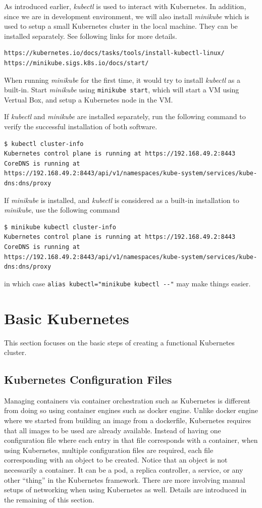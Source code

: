 As introduced earlier, \textit{kubectl} is used to interact with Kubernetes. In addition, since we are in development environment, we will also install \textit{minikube} which is used to setup a small Kubernetes cluster in the local machine. They can be installed separately. See following links for more details.
\begin{lstlisting}
https://kubernetes.io/docs/tasks/tools/install-kubectl-linux/
https://minikube.sigs.k8s.io/docs/start/
\end{lstlisting}
When running \textit{minikube} for the first time, it would try to install \textit{kubectl} as a built-in. Start \textit{minikube} using \verb|minikube start|, which will start a VM using Vertual Box, and setup a Kubernetes node in the VM.

If \textit{kubectl} and \textit{minikube} are installed separately, run the following command to verify the successful installation of both software.
\begin{lstlisting}
$ kubectl cluster-info
Kubernetes control plane is running at https://192.168.49.2:8443
CoreDNS is running at https://192.168.49.2:8443/api/v1/namespaces/kube-system/services/kube-dns:dns/proxy
\end{lstlisting}
If \textit{minikube} is installed, and \textit{kubectl} is considered as a built-in installation to \textit{minikube}, use the following command
\begin{lstlisting}
$ minikube kubectl cluster-info
Kubernetes control plane is running at https://192.168.49.2:8443
CoreDNS is running at https://192.168.49.2:8443/api/v1/namespaces/kube-system/services/kube-dns:dns/proxy
\end{lstlisting}
in which case \verb|alias kubectl="minikube kubectl --"| may make things easier.

\section{Basic Kubernetes}

This section focuses on the basic steps of creating a functional Kubernetes cluster.

\subsection{Kubernetes Configuration Files}

Managing containers via container orchestration such as Kubernetes is different from doing so using container engines such as docker engine. Unlike docker engine where we started from building an image from a dockerfile, Kubernetes requires that all images to be used are already available. Instead of having one configuration file where each entry in that file corresponds with a container, when using Kubernetes, multiple configuration files are required, each file corresponding with an object to be created. Notice that an object is not necessarily a container. It can be a pod, a replica controller, a service, or any other ``thing'' in the Kubernetes framework. There are more involving manual setups of networking when using Kubernetes as well. Details are introduced in the remaining of this section.

